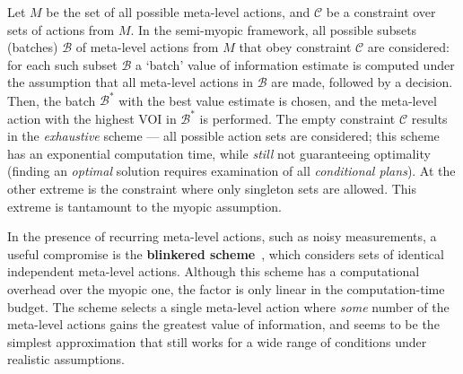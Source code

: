 Let $M$ be the set of all possible meta-level actions, and
${\mathcal C}$ be a constraint over sets of actions from $M$. In the
semi-myopic framework, all possible subsets (batches) ${\mathcal B}$
of meta-level actions from $M$ that obey constraint ${\mathcal C}$ are
considered: for each such subset ${\mathcal B}$ a `batch' value of
information estimate is computed under the assumption that all
meta-level actions in ${\mathcal B}$ are made, followed by a decision.
Then, the batch ${\mathcal B}^*$ with the best
value estimate is chosen, and the meta-level action with the highest
VOI in ${\mathcal B}^*$ is performed.  The empty constraint $\mathcal
C$ results in the {\em exhaustive} scheme --- all possible action sets
are considered; this scheme has an exponential computation time, while
{\em still} not guaranteeing optimality (finding an
\emph{optimal} solution requires examination of all \emph{conditional plans}).
At the other extreme is the constraint where only singleton sets are
allowed. This extreme is tantamount to the myopic assumption.

In the presence of recurring meta-level actions, such as
noisy measurements, a useful compromise is the \textbf{blinkered
scheme}~\cite{TolpinShimony.blinkered}, which considers sets of
identical independent meta-level actions.  Although this scheme has a
computational overhead over the myopic one, the factor is only linear
in the computation-time budget.  The scheme selects a single meta-level action where
{\em some} number of the meta-level actions gains the greatest value
of information, and seems to be the simplest approximation that still
works for a wide range of conditions under realistic assumptions.
